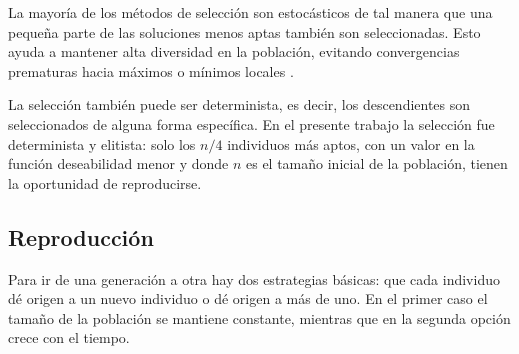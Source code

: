 La mayor\'ia de los m\'etodos de selecci\'on son estoc\'asticos de 
tal manera que una peque\~na parte de las soluciones menos aptas 
tambi\'en son seleccionadas. Esto ayuda a mantener alta diversidad en
la poblaci\'on, evitando convergencias prematuras hacia m\'aximos o 
m\'inimos locales \citep{Kur199901}.

La selecci\'on tambi\'en puede ser determinista, es decir, los 
descendientes son seleccionados de alguna forma espec\'ifica. En el 
presente trabajo la selecci\'on fue determinista y elitista: solo los
$n/4$ individuos m\'as aptos, con un valor en la funci\'on 
deseabilidad menor y donde $n$ es el tama\~no inicial de la 
poblaci\'on, tienen la oportunidad de reproducirse. 

\subsection{Reproducci\'on}
Para ir de una generaci\'on a otra hay dos estrategias b\'asicas: que
cada individuo d\'e origen a un nuevo individuo o d\'e origen a m\'as
de uno. En el primer caso el tama\~no de la poblaci\'on se mantiene 
constante, mientras que en la segunda opci\'on crece con el tiempo.


